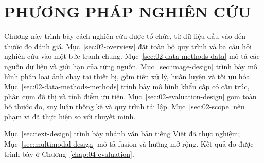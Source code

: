 \chapter{PHƯƠNG PHÁP NGHIÊN CỨU}\label{chap:02-data-methods}
Chương này trình bày cách nghiên cứu được tổ chức, từ dữ liệu đầu vào đến thước đo đánh giá. Mục~\ref{sec:02-overview} đặt toàn bộ quy trình và ba câu hỏi nghiên cứu vào một bức tranh chung. Mục~\ref{sec:02-data-methods-data} mô tả các nguồn dữ liệu và giới hạn của từng nguồn. Mục~\ref{sec:image-design} trình bày mô hình phân loại ảnh chạy tại thiết bị, gồm tiền xử lý, huấn luyện và tối ưu hóa. Mục~\ref{sec:02-data-methods-methods} trình bày mô hình khẩn cấp có cấu trúc, phân cụm đồ thị và tính điểm ưu tiên. Mục~\ref{sec:02-evaluation-design} gom toàn bộ thước đo, suy luận thống kê và quy trình tái lập. Mục~\ref{sec:02-scope} nêu phạm vi đã thực hiện so với thuyết minh.

Mục~\ref{sec:text-design} trình bày nhánh văn bản tiếng Việt đã thực nghiệm; Mục~\ref{sec:multimodal-design} mô tả fusion và hướng mở rộng. Kết quả đo được trình bày ở Chương~\ref{chap:04-evaluation}.








